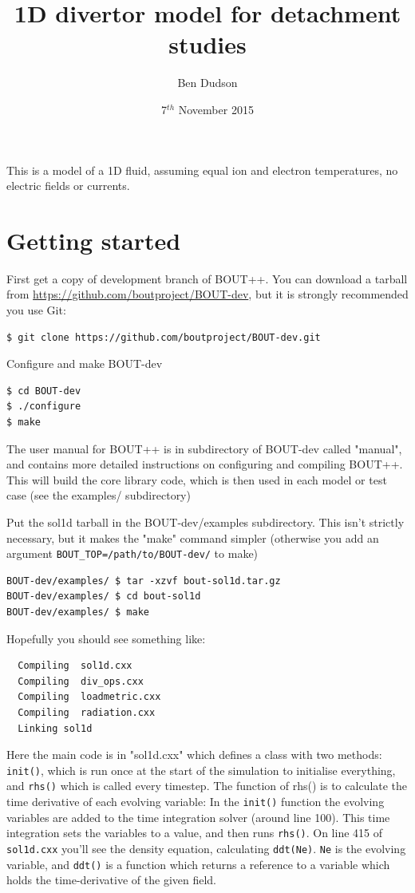 \documentclass[12pt,a4paper]{article}
\title{ 1D divertor model for detachment studies }%
\author{ Ben Dudson }%
\date{ 7$^{th}$ November 2015 }%
\begin{document}
\maketitle %
\thispagestyle{fancy}%

This is a model of a 1D fluid, assuming equal ion and electron temperatures, no electric fields or currents. 

\section{Getting started}

First get a copy of development branch of BOUT++. You can download a tarball from \url{https://github.com/boutproject/BOUT-dev}, but it is strongly recommended you use Git:

\begin{verbatim}
$ git clone https://github.com/boutproject/BOUT-dev.git
\end{verbatim}

Configure and make BOUT-dev

\begin{verbatim}
$ cd BOUT-dev
$ ./configure
$ make
\end{verbatim}

The user manual for BOUT++ is in subdirectory of BOUT-dev called "manual", and contains more detailed
instructions on configuring and compiling BOUT++.
This will build the core library code, which is then used in each model or test case (see the examples/ subdirectory)

Put the sol1d tarball in the BOUT-dev/examples subdirectory. This isn't strictly necessary, but it makes the "make" command simpler (otherwise you add an argument \texttt{BOUT\_TOP=/path/to/BOUT-dev/} to make)

\begin{verbatim}
BOUT-dev/examples/ $ tar -xzvf bout-sol1d.tar.gz
BOUT-dev/examples/ $ cd bout-sol1d
BOUT-dev/examples/ $ make
\end{verbatim}

Hopefully you should see something like:

\begin{verbatim}
  Compiling  sol1d.cxx
  Compiling  div_ops.cxx
  Compiling  loadmetric.cxx
  Compiling  radiation.cxx
  Linking sol1d
\end{verbatim}

Here the main code is in "sol1d.cxx" which defines a class with two methods: \texttt{init()}, which is run once at the start of the simulation to initialise everything, and \texttt{rhs()} which is called every timestep. The function of rhs() is to calculate the time derivative of each evolving variable: In the \texttt{init()} function the evolving variables are added to the time integration solver (around line 100). This time integration sets the variables to a value, and then runs \texttt{rhs()}. On line 415 of
\texttt{sol1d.cxx} you'll see the density equation, calculating \texttt{ddt(Ne)}. \texttt{Ne} is the evolving variable, and \texttt{ddt()} is a function which returns a reference to a variable which holds the time-derivative of the given field. 
\end{document}
